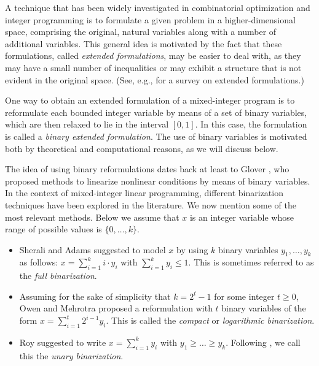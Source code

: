 \documentclass[11pt,a4paper]{article}
\newcommand{\1}{\textbf{1}}
\begin{document}
A  technique that has been widely investigated in combinatorial optimization and integer  programming is to formulate a given problem in a higher-dimensional space, comprising  the original, natural variables along with a number of additional variables. This general idea is motivated by the fact that these formulations, called  {\em extended formulations}, may be easier to deal with, as they may have a small number of inequalities or may exhibit a structure that is not evident in the original space. (See, e.g., \cite{conforti2010extended} for a survey on extended formulations.)

One way to obtain an extended formulation of a mixed-integer program is to reformulate each bounded integer variable by means of a set of binary variables, which are then relaxed to lie in the interval $[0,1]$. In this case, the formulation is called a {\em binary extended formulation}. The use of binary variables is motivated both by theoretical and computational reasons, as we will discuss below.

The idea of using binary reformulations dates back at least to Glover \cite{glover1975improved}, who proposed methods to linearize nonlinear conditions by means of binary variables.  In the context of mixed-integer linear programming, different binarization techniques have been explored in the literature. We now mention some of the most relevant methods. Below we assume that $x$ is an integer variable whose range of possible values is $\{0,\dots,k\}$.
\begin{itemize}
\item Sherali and Adams \cite{sherali2013reformulation} suggested to model $x$ by using $k$ binary variables $y_1,\dots,y_k$ as follows: $x=\sum_{i=1}^ki\cdot y_i$ with $\sum_{i=1}^ky_i\le1$. This is sometimes referred to as the {\em full binarization}.
\item Assuming for the sake of simplicity that $k=2^t-1$ for some integer $t\ge0$, Owen and Mehrotra \cite{owen2002value} proposed a reformulation with $t$ binary variables of the form $x=\sum_{i=1}^t2^{i-1}y_i$. This is called the {\em compact} or {\em logarithmic binarization}.
\item Roy \cite{roy2007binarize} suggested to write $x=\sum_{i=1}^k y_i$ with $y_1\ge\dots\ge y_k$. Following \cite{dash2018binary}, we call this the {\em unary binarization}.
\end{itemize}
\end{document}
